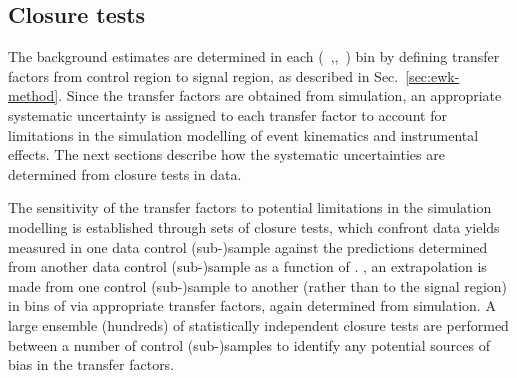 %

\subsection{Closure tests}
\label{sec:closure-tests-desc}
\label{sec:bkgdnorm-syst}

The background estimates are determined in each (\nb~,\njet,~\scalht) bin by
defining transfer factors from control region to signal region, as
described in Sec.~\ref{sec:ewk-method}. Since the transfer factors
are obtained from simulation, an appropriate systematic uncertainty is
assigned to each transfer factor to account for limitations in the
simulation modelling of event kinematics and instrumental effects. The
next sections describe how the systematic uncertainties are
determined from closure tests in data.

The sensitivity of the transfer factors to potential limitations in
the simulation modelling is established through sets of closure tests,
which confront data yields measured in one data control (sub-)sample
against the predictions determined from another data control
(sub-)sample as a function of \scalht. \ie, an extrapolation is made
from one control (sub-)sample to another (rather than to the signal
region) in bins of \scalht via appropriate transfer factors, again
determined from simulation. A large ensemble (\ie hundreds) of
statistically independent closure tests are performed between a number
of control (sub-)samples to identify any potential sources of bias in
the transfer factors.

